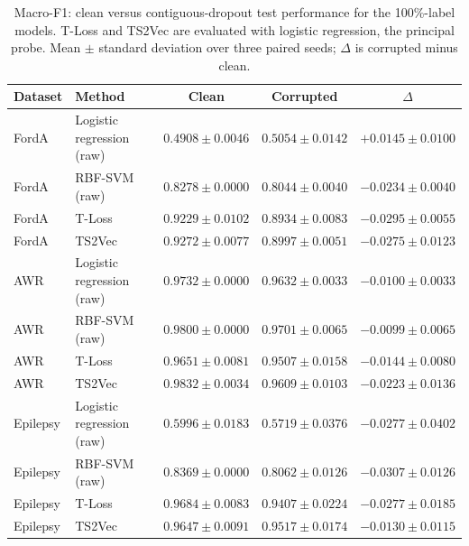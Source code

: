 \documentclass[a4paper,11pt]{article}
\begin{document}
\begin{table}[htbp]
    \centering
    \small
    \begin{tabular}{l l c c c}
        \toprule
        Dataset & Method & Clean & Corrupted & $\Delta$ \\
        \midrule
        FordA & Logistic regression (raw) & $0.4908 \pm 0.0046$ & $0.5054 \pm 0.0142$ & $+0.0145 \pm 0.0100$ \\
        FordA & RBF-SVM (raw)             & $0.8278 \pm 0.0000$ & $0.8044 \pm 0.0040$ & $-0.0234 \pm 0.0040$ \\
        FordA & T-Loss                    & $0.9229 \pm 0.0102$ & $0.8934 \pm 0.0083$ & $-0.0295 \pm 0.0055$ \\
        FordA & TS2Vec                    & $0.9272 \pm 0.0077$ & $0.8997 \pm 0.0051$ & $-0.0275 \pm 0.0123$ \\
        \midrule
        AWR & Logistic regression (raw) & $0.9732 \pm 0.0000$ & $0.9632 \pm 0.0033$ & $-0.0100 \pm 0.0033$ \\
        AWR & RBF-SVM (raw)             & $0.9800 \pm 0.0000$ & $0.9701 \pm 0.0065$ & $-0.0099 \pm 0.0065$ \\
        AWR & T-Loss                    & $0.9651 \pm 0.0081$ & $0.9507 \pm 0.0158$ & $-0.0144 \pm 0.0080$ \\
        AWR & TS2Vec                    & $0.9832 \pm 0.0034$ & $0.9609 \pm 0.0103$ & $-0.0223 \pm 0.0136$ \\
        \midrule
        Epilepsy & Logistic regression (raw) & $0.5996 \pm 0.0183$ & $0.5719 \pm 0.0376$ & $-0.0277 \pm 0.0402$ \\
        Epilepsy & RBF-SVM (raw)             & $0.8369 \pm 0.0000$ & $0.8062 \pm 0.0126$ & $-0.0307 \pm 0.0126$ \\
        Epilepsy & T-Loss                    & $0.9684 \pm 0.0083$ & $0.9407 \pm 0.0224$ & $-0.0277 \pm 0.0185$ \\
        Epilepsy & TS2Vec                    & $0.9647 \pm 0.0091$ & $0.9517 \pm 0.0174$ & $-0.0130 \pm 0.0115$ \\
        \bottomrule
    \end{tabular}
    \caption{Macro-F1: clean versus contiguous-dropout test performance for the 100\%-label models. T-Loss and TS2Vec are evaluated with logistic regression, the principal probe. Mean $\pm$ standard deviation over three paired seeds; $\Delta$ is corrupted minus clean.}
    \label{tab:dropout-f1}
\end{table}
\end{document}
